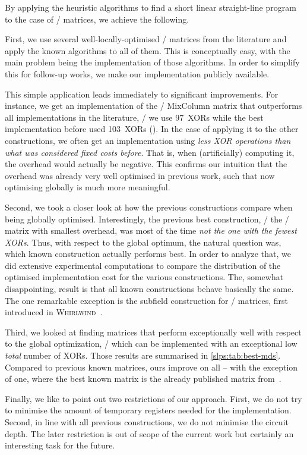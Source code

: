 By applying the heuristic algorithms to find a short linear straight-line program to the case of \MDS/ matrices, we achieve the following.

First, we use several well-locally-optimised \MDS/ matrices from the literature and apply the known algorithms to all of them.
This is conceptually easy, with the main problem being the implementation of those algorithms.
In order to simplify this for follow-up works, we make our implementation publicly available.

This simple application leads immediately to significant improvements.
For instance, we get an implementation of the \AES/ MixColumn matrix that outperforms all implementations in the literature, \ie/ we use 97~XORs while the best implementation before used 103~XORs (\cite{CHES:JMPS17}).
In the case of applying it to the other constructions, we often get an implementation using \emph{less XOR operations than what was considered fixed costs before}.
That is, when (artificially) computing it, the overhead would actually be negative.
This confirms our intuition that the overhead was already very well optimised in previous work, such that now optimising globally is much more meaningful.

Second, we took a closer look at how the previous constructions compare when being globally optimised.
Interestingly, the previous best construction, \ie/ the \MDS/ matrix with smallest overhead, was most of the time \emph{not the one with the fewest XORs}.
Thus, with respect to the global optimum, the natural question was, which known construction actually performs best.
In order to analyze that, we did extensive experimental computations to compare the distribution of the optimised implementation cost for the various constructions.
The, somewhat disappointing, result is that all known constructions behave basically the same.
The one remarkable exception is the subfield construction for \MDS/ matrices, first introduced in \textsc{Whirlwind}~\cite{DCC:BNNRT10}.

Third, we looked at finding matrices that perform exceptionally well with respect to the global optimization, \ie/ which can be implemented with an exceptional low \emph{total} number of XORs.
Those results are summarised in \cref{slps:tab:best-mds}.
Compared to previous known matrices, ours improve on all -- with the exception of one, where the best known matrix is the already published matrix from~\cite{ToSC:SarSye16}.

Finally, we like to point out two restrictions of our approach.
First, we do not try to minimise the amount of temporary registers needed for the implementation.
Second, in line with all previous constructions, we do not minimise the circuit depth.
The later restriction is out of scope of the current work but certainly an interesting task for the future.

